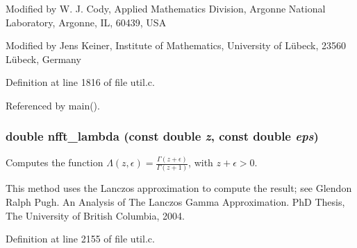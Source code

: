 Modified by W. J. Cody, Applied Mathematics Division, Argonne National Laboratory, Argonne, IL, 60439, USA

Modified by Jens Keiner, Institute of Mathematics, University of Lübeck, 23560 Lübeck, Germany 

Definition at line 1816 of file util.c.

Referenced by main().\hypertarget{group__nfftutil_g8b29244516d573dca1d0fe134a97b9a6}{
\subsubsection{\setlength{\rightskip}{0pt plus 5cm}double nfft\_\-lambda (const double {\em z}, const double {\em eps})}}
\label{group__nfftutil_g8b29244516d573dca1d0fe134a97b9a6}


Computes the function $\Lambda(z,\epsilon) = \frac{\Gamma(z+\epsilon)}{\Gamma(z+1)}$, with $ z + \epsilon > 0$. 

This method uses the Lanczos approximation to compute the result; see Glendon Ralph Pugh. An Analysis of The Lanczos Gamma Approximation. PhD Thesis, The University of British Columbia, 2004. 

Definition at line 2155 of file util.c.